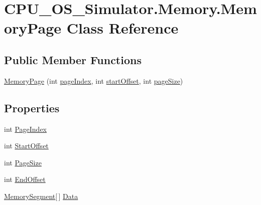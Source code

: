 \hypertarget{class_c_p_u___o_s___simulator_1_1_memory_1_1_memory_page}{}\section{C\+P\+U\+\_\+\+O\+S\+\_\+\+Simulator.\+Memory.\+Memory\+Page Class Reference}
\label{class_c_p_u___o_s___simulator_1_1_memory_1_1_memory_page}
\subsection*{Public Member Functions}
\begin{DoxyCompactItemize}
\item 
\hyperlink{class_c_p_u___o_s___simulator_1_1_memory_1_1_memory_page_ab471d5de4e2b4e5f6585ae3782fa2ae7}{Memory\+Page} (int \hyperlink{class_c_p_u___o_s___simulator_1_1_memory_1_1_memory_page_acf60a7bdefab6120fe080854b5f0b38b}{page\+Index}, int \hyperlink{class_c_p_u___o_s___simulator_1_1_memory_1_1_memory_page_a6fe2e28385db19a1968a41efe3df3f38}{start\+Offset}, int \hyperlink{class_c_p_u___o_s___simulator_1_1_memory_1_1_memory_page_abbbd3ea0ef99dac19c6bd9694dbdfd3a}{page\+Size})
\end{DoxyCompactItemize}
\subsection*{Properties}
\begin{DoxyCompactItemize}
\item 
int \hyperlink{class_c_p_u___o_s___simulator_1_1_memory_1_1_memory_page_aec80700d036a447e7e6ec204513e3a59}{Page\+Index}
\item 
int \hyperlink{class_c_p_u___o_s___simulator_1_1_memory_1_1_memory_page_ad700979e51dd3d05470c681588c6fa79}{Start\+Offset}
\item 
int \hyperlink{class_c_p_u___o_s___simulator_1_1_memory_1_1_memory_page_a6fba0e419e59c58fb3c5444a8e437ab3}{Page\+Size}
\item 
int \hyperlink{class_c_p_u___o_s___simulator_1_1_memory_1_1_memory_page_abe850b4a088a820ecf598af1cd9a7deb}{End\+Offset}
\item 
\hyperlink{class_c_p_u___o_s___simulator_1_1_memory_1_1_memory_segment}{Memory\+Segment}\mbox{[}$\,$\mbox{]} \hyperlink{class_c_p_u___o_s___simulator_1_1_memory_1_1_memory_page_a8bf84e82146f9ff35ffbcc32b93a9db0}{Data}
\end{DoxyCompactItemize}

